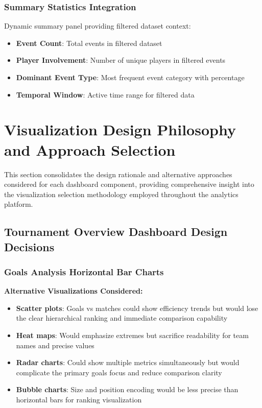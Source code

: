 \documentclass[12pt,a4paper]{article}
\begin{document}
\subsubsection{Summary Statistics Integration}
Dynamic summary panel providing filtered dataset context:
\begin{itemize}
    \item \textbf{Event Count}: Total events in filtered dataset
    \item \textbf{Player Involvement}: Number of unique players in filtered events
    \item \textbf{Dominant Event Type}: Most frequent event category with percentage
    \item \textbf{Temporal Window}: Active time range for filtered data
\end{itemize}




\section{Visualization Design Philosophy and Approach Selection}

This section consolidates the design rationale and alternative approaches considered for each dashboard component, providing comprehensive insight into the visualization selection methodology employed throughout the analytics platform.

\subsection{Tournament Overview Dashboard Design Decisions}

\subsubsection{Goals Analysis Horizontal Bar Charts}
\textbf{Alternative Visualizations Considered:}
\begin{itemize}
    \item \textbf{Scatter plots}: Goals vs matches could show efficiency trends but would lose the clear hierarchical ranking and immediate comparison capability
    \item \textbf{Heat maps}: Would emphasize extremes but sacrifice readability for team names and precise values
    \item \textbf{Radar charts}: Could show multiple metrics simultaneously but would complicate the primary goals focus and reduce comparison clarity
    \item \textbf{Bubble charts}: Size and position encoding would be less precise than horizontal bars for ranking visualization
\end{itemize}
\end{document}
